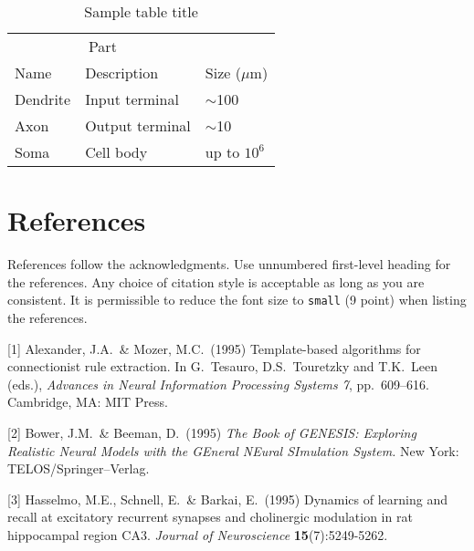 \documentclass{article}
\begin{document}
\begin{table}
  \caption{Sample table title}
  \label{sample-table}
  \centering
  \begin{tabular}{lll}
    \toprule
    \multicolumn{2}{c}{Part}                   \\
    \cmidrule(r){1-2}
    Name     & Description     & Size ($\mu$m) \\
    \midrule
    Dendrite & Input terminal  & $\sim$100     \\
    Axon     & Output terminal & $\sim$10      \\
    Soma     & Cell body       & up to $10^6$  \\
    \bottomrule
  \end{tabular}
\end{table}



\section*{References}

References follow the acknowledgments. Use unnumbered first-level heading for
the references. Any choice of citation style is acceptable as long as you are
consistent. It is permissible to reduce the font size to \verb+small+ (9 point)
when listing the references.
\medskip

\small

[1] Alexander, J.A.\ \& Mozer, M.C.\ (1995) Template-based algorithms for
connectionist rule extraction. In G.\ Tesauro, D.S.\ Touretzky and T.K.\ Leen
(eds.), {\it Advances in Neural Information Processing Systems 7},
pp.\ 609--616. Cambridge, MA: MIT Press.

[2] Bower, J.M.\ \& Beeman, D.\ (1995) {\it The Book of GENESIS: Exploring
  Realistic Neural Models with the GEneral NEural SImulation System.}  New York:
TELOS/Springer--Verlag.

[3] Hasselmo, M.E., Schnell, E.\ \& Barkai, E.\ (1995) Dynamics of learning and
recall at excitatory recurrent synapses and cholinergic modulation in rat
hippocampal region CA3. {\it Journal of Neuroscience} {\bf 15}(7):5249-5262.
\end{document}
